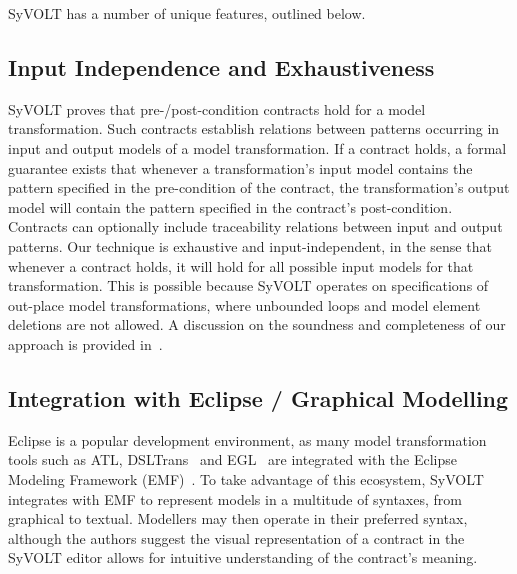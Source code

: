SyVOLT has a number of unique features, outlined below.

\subsection{Input Independence and Exhaustiveness} 

SyVOLT proves that pre-/post-condition contracts hold for a model transformation.
Such contracts establish relations between patterns occurring in input and output
models of a model transformation. If a contract holds, a formal guarantee
exists that whenever a transformation's input model contains the pattern
specified in the pre-condition of the contract, the transformation's output model will contain
the pattern specified in the contract's post-condition. Contracts can 
optionally include traceability relations between input and output patterns. 
Our technique is exhaustive and input-independent, in the sense that whenever a contract holds, it
will hold for all possible input models for that transformation. This is possible
because SyVOLT operates on specifications of out-place model transformations,
where unbounded loops and model element deletions are not allowed. A discussion
on the soundness and completeness of our approach is provided
in~\cite{Lucio2014}.




\subsection{Integration with Eclipse / Graphical Modelling}

Eclipse is a popular development environment, as many model transformation tools
such as ATL, DSLTrans~\cite{Barroca2011} and
EGL~\cite{eglTool} are integrated with the Eclipse
Modeling Framework (EMF)~\cite{emfTool}. To take
advantage of this ecosystem, SyVOLT integrates with EMF to represent models in a
multitude of syntaxes, from graphical to textual. Modellers may then operate
in their preferred syntax, although the authors suggest the visual
representation of a contract in the SyVOLT editor allows for intuitive
understanding of the contract's meaning.




